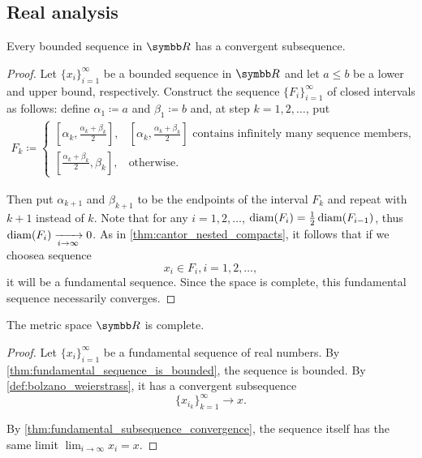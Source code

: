 \subsection{Real analysis}\label{subsec:real_analysis}

\begin{theorem}\label{def:bolzano_weierstrass}
  Every bounded sequence in \( \BB{R} \) has a convergent subsequence.
\end{theorem}
\begin{proof}
  Let \( \{ x_i \}_{i=1}^\infty \) be a bounded sequence in \( \BB{R} \) and let \( a \leq b \) be a lower and upper bound, respectively. Construct the sequence \( \{ F_i \}_{i=1}^\infty \) of closed intervals as follows: define \( \alpha_1 \coloneqq a \) and \( \beta_1 \coloneqq b \) and, at step \( k = 1, 2, \ldots \), put
  \begin{align*}
    F_k \coloneqq \begin{cases}
      [\alpha_k, \tfrac{\alpha_k+\beta_k} 2], &[\alpha_k, \tfrac{\alpha_k+\beta_k} 2]\text{ contains infinitely many sequence members}, \\
      [\tfrac{\alpha_k+\beta_k} 2, \beta_k], &\text{otherwise}.
    \end{cases}
  \end{align*}

  Then put \( \alpha_{k+1} \) and \( \beta_{k+1} \) to be the endpoints of the interval \( F_k \) and repeat with \( k+1 \) instead of \( k \). Note that for any \( i = 1, 2, \ldots \), \( \operatorname{diam}(F_i) = \tfrac 1 2 \operatorname{diam}(F_{i-1}) \), thus \( \operatorname{diam}(F_i) \xrightarrow[i \to \infty]{} 0 \). As in \cref{thm:cantor_nested_compacts}, it follows that if we choose\AOC a sequence
  \begin{equation*}
    x_i \in F_i, i = 1, 2, \ldots,
  \end{equation*}
  it will be a fundamental sequence. Since the space is complete, this fundamental sequence necessarily converges.
\end{proof}

\begin{theorem}\label{def:real_numbers_complete_metric_space}
  The metric space \( \BB{R} \) is complete.
\end{theorem}
\begin{proof}
  Let \( \{ x_i \}_{i=1}^\infty \) be a fundamental sequence of real numbers. By \cref{thm:fundamental_sequence_is_bounded}, the sequence is bounded. By \cref{def:bolzano_weierstrass}, it has a convergent subsequence
  \begin{equation*}
    \{ x_{i_k} \}_{k=1}^\infty \to x.
  \end{equation*}

  By \cref{thm:fundamental_subsequence_convergence}, the sequence itself has the same limit \( \lim_{i \to \infty} x_i = x \).
\end{proof}
